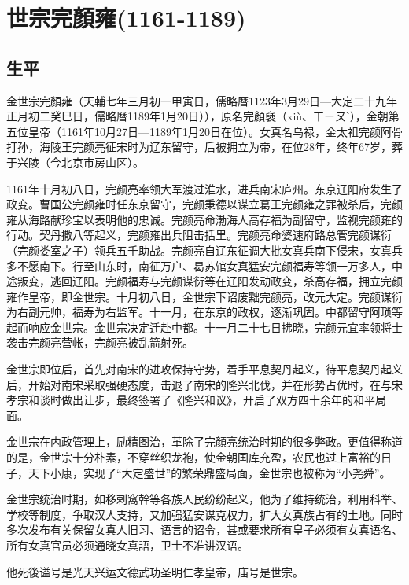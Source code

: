 
\section{世宗完顏雍\tiny(1161-1189)}

\subsection{生平}

金世宗完顏雍（天輔七年三月初一甲寅日，儒略曆1123年3月29日—大定二十九年正月初二癸巳日，儒略曆1189年1月20日）），原名完顏褎（xiù、ㄒㄧㄡˋ），金朝第五位皇帝（1161年10月27日—1189年1月20日在位）。女真名乌禄，金太祖完颜阿骨打孙，海陵王完颜亮征宋时为辽东留守，后被拥立为帝，在位28年，终年67岁，葬于兴陵（今北京市房山区）。

1161年十月初八日，完颜亮率领大军渡过淮水，进兵南宋庐州。东京辽阳府发生了政变。曹国公完颜雍时任东京留守，完颜秉德以谋立葛王完颜雍之罪被杀后，完颜雍从海路献珍宝以表明他的忠诚。完颜亮命渤海人高存福为副留守，监视完颜雍的行动。契丹撒八等起义，完颜雍出兵阻击括里。完颜亮命婆速府路总管完颜谋衍（完颜娄室之子）领兵五千助战。完颜亮自辽东征调大批女真兵南下侵宋，女真兵多不愿南下。行至山东时，南征万户、曷苏馆女真猛安完颜福寿等领一万多人，中途叛变，逃回辽阳。完颜福寿与完颜谋衍等在辽阳发动政变，杀高存福，拥立完颜雍作皇帝，即金世宗。十月初八日，金世宗下诏废黜完颜亮，改元大定。完颜谋衍为右副元帅，福寿为右监军。十一月，在东京的政权，逐渐巩固。中都留守阿琐等起而响应金世宗。金世宗决定迁赴中都。十一月二十七日拂晓，完颜元宜率领将士袭击完颜亮营帐，完颜亮被乱箭射死。

金世宗即位后，首先对南宋的进攻保持守势，着手平息契丹起义，待平息契丹起义后，开始对南宋采取强硬态度，击退了南宋的隆兴北伐，并在形势占优时，在与宋孝宗和谈时做出让步，最终签署了《隆兴和议》，开启了双方四十余年的和平局面。

金世宗在内政管理上，励精图治，革除了完顏亮统治时期的很多弊政。更值得称道的是，金世宗十分朴素，不穿丝织龙袍，使金朝国库充盈，农民也过上富裕的日子，天下小康，实现了“大定盛世”的繁荣鼎盛局面，金世宗也被称为“小尧舜”。

金世宗统治时期，如移剌窩幹等各族人民纷纷起义，他为了维持统治，利用科举、学校等制度，争取汉人支持，又加强猛安谋克权力，扩大女真族占有的土地。同时多次发布有关保留女真人旧习、语言的诏令，甚或要求所有皇子必须有女真语名、所有女真官员必须通晓女真語，卫士不准讲汉语。

他死後谥号是光天兴运文德武功圣明仁孝皇帝，庙号是世宗。

